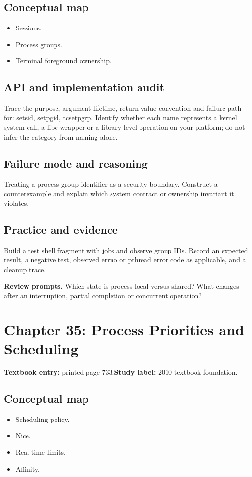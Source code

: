 \documentclass[11pt,letterpaper,oneside]{report}
\begin{document}
\subsection{Conceptual map}
\begin{itemize}
\item Sessions.
\item Process groups.
\item Terminal foreground ownership.
\end{itemize}
\subsection{API and implementation audit}
Trace the purpose, argument lifetime, return-value convention and failure path for: setsid, setpgid, tcsetpgrp. Identify whether each name represents a kernel system call, a libc wrapper or a library-level operation on your platform; do not infer the category from naming alone.

\subsection{Failure mode and reasoning}
Treating a process group identifier as a security boundary. Construct a counterexample and explain which system contract or ownership invariant it violates.

\subsection{Practice and evidence}
Build a test shell fragment with jobs and observe group IDs. Record an expected result, a negative test, observed errno or pthread error code as applicable, and a cleanup trace.

\textbf{Review prompts.} Which state is process-local versus shared? What changes after an interruption, partial completion or concurrent operation?

\section{Chapter 35: Process Priorities and Scheduling}
\textbf{Textbook entry:} printed page 733.\quad \textbf{Study label:} 2010 textbook foundation.

\subsection{Conceptual map}
\begin{itemize}
\item Scheduling policy.
\item Nice.
\item Real-time limits.
\item Affinity.
\end{itemize}
\end{document}
